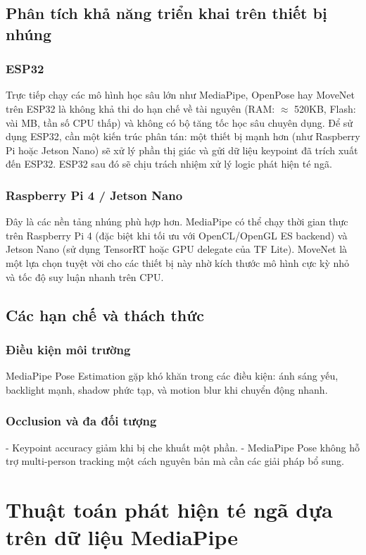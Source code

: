 \subsection{Phân tích khả năng triển khai trên thiết bị nhúng}

\subsubsection{ESP32}
Trực tiếp chạy các mô hình học sâu lớn như MediaPipe, OpenPose hay MoveNet trên ESP32 là không khả thi do hạn chế về tài nguyên (RAM: $\approx$ 520KB, Flash: vài MB, tần số CPU thấp) và không có bộ tăng tốc học sâu chuyên dụng. Để sử dụng ESP32, cần một kiến trúc phân tán: một thiết bị mạnh hơn (như Raspberry Pi hoặc Jetson Nano) sẽ xử lý phần thị giác và gửi dữ liệu keypoint đã trích xuất đến ESP32. ESP32 sau đó sẽ chịu trách nhiệm xử lý logic phát hiện té ngã.

\subsubsection{Raspberry Pi 4 / Jetson Nano}
Đây là các nền tảng nhúng phù hợp hơn. MediaPipe có thể chạy thời gian thực trên Raspberry Pi 4 (đặc biệt khi tối ưu với OpenCL/OpenGL ES backend) và Jetson Nano (sử dụng TensorRT hoặc GPU delegate của TF Lite). MoveNet là một lựa chọn tuyệt vời cho các thiết bị này nhờ kích thước mô hình cực kỳ nhỏ và tốc độ suy luận nhanh trên CPU.

\subsection{Các hạn chế và thách thức}

\subsubsection{Điều kiện môi trường}
MediaPipe Pose Estimation gặp khó khăn trong các điều kiện: ánh sáng yếu, backlight mạnh, shadow phức tạp, và motion blur khi chuyển động nhanh.

\subsubsection{Occlusion và đa đối tượng}
- Keypoint accuracy giảm khi bị che khuất một phần.
- MediaPipe Pose không hỗ trợ multi-person tracking một cách nguyên bản mà cần các giải pháp bổ sung.

\section{Thuật toán phát hiện té ngã dựa trên dữ liệu MediaPipe}

